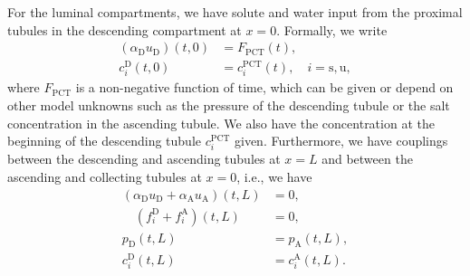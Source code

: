 \documentclass{article}
\begin{document}
For the luminal compartments, we have solute and water input from the proximal tubules in the descending compartment at $x=0$.
Formally, we write
\begin{align}
    (\alpha_\mathrm{D} u_\mathrm{D})(t,0) &= F_\mathrm{PCT}(t),\\
    c_i^\mathrm{D}(t,0) &= c_{i}^{\mathrm{PCT}}(t),\quad i=\mathrm{s,u},
\end{align}
    where $F_\mathrm{PCT}$ is a non-negative function of time, which can be given or depend on other model unknowns such as the pressure of the descending tubule or the salt concentration in the ascending tubule.
We also have the concentration at the beginning of the descending tubule $c_i^\mathrm{PCT}$ given.
Furthermore, we have couplings between the descending and ascending tubules at $x=L$ and between the ascending and collecting tubules at $x=0$, i.e., we have
\begin{align}
    (\alpha_\mathrm{D}u_\mathrm{D}+\alpha_\mathrm{A}u_\mathrm{A})(t,L) &= 0,\label{eq:bdry_ADw} \\
    \quad\left( f_i^\mathrm{D}+f_i^\mathrm{A} \right)(t,L) &= 0,\label{eq:bdry_ADs}\\
    p_\mathrm{D}(t,L)&= p_{\mathrm{A}}(t,L),\\ 
    c_i^\mathrm{D}(t,L) &=c_i^\mathrm{A}(t,L).\label{eq:bdry_ADc}
\end{align}
\end{document}
